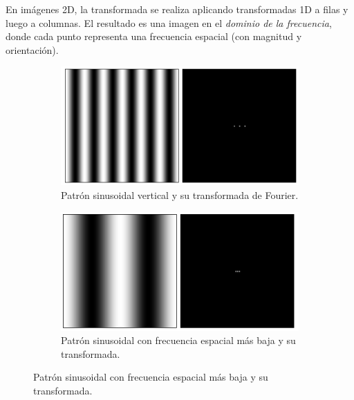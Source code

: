 En imágenes 2D, la transformada se realiza aplicando transformadas 1D a filas y luego a columnas. El resultado es una imagen en el \emph{dominio de la frecuencia}, donde cada punto representa una frecuencia espacial (con magnitud y orientación).
\begin{figure}[!htbp]
    \centering
    \begin{subfigure}[b]{0.45\textwidth}
        \centering
        \includegraphics[width=\textwidth]{img/f1.png}
        \caption{Patrón sinusoidal vertical y su transformada de Fourier.}
        \label{fig:sinusoide_vertical}
    \end{subfigure}
    \hfill
    \begin{subfigure}[b]{0.45\textwidth}
        \centering
        \includegraphics[width=\textwidth]{img/f2.png}
        \caption{Patrón sinusoidal con frecuencia espacial más baja y su transformada.}
        \label{fig:sinusoide_baja_frecuencia}
    \end{subfigure}

    \vspace{0.5cm}


\end{figure}
